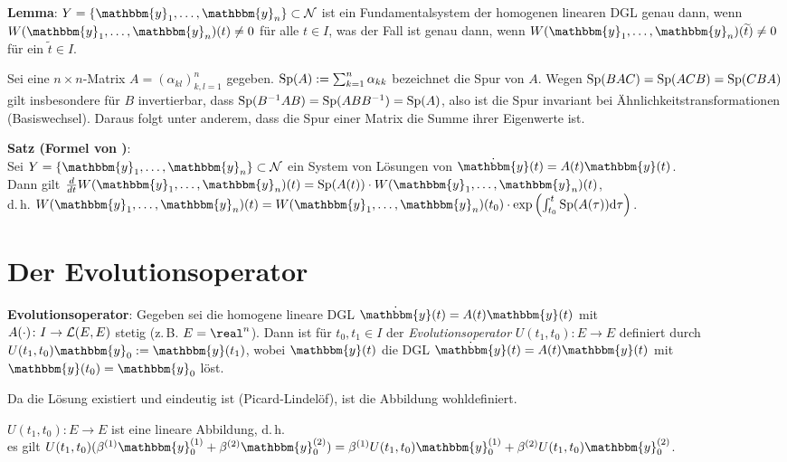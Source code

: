 \linie

\textbf{Lemma}:
$Y = \{\mathbbm{y}_1, \dotsc, \mathbbm{y}_n\} \subset \mathcal{N}$
ist ein Fundamentalsystem der homogenen linearen DGL  genau
dann, wenn $W(\mathbbm{y}_1, \dotsc, \mathbbm{y}_n)(t) \not= 0$ für alle
$t \in I$, was der Fall ist genau dann, wenn
$W(\mathbbm{y}_1, \dotsc, \mathbbm{y}_n)(\widetilde{t}) \not= 0$ für ein
$\widetilde{t} \in I$.

Sei eine $n \times n$-Matrix $A = (\alpha_{kl})_{k,l=1}^n$ gegeben.
$\operatorname{Sp}(A) := \sum_{k=1}^n \alpha_{kk}$ bezeichnet die Spur von $A$.
Wegen $\operatorname{Sp}(BAC) = \operatorname{Sp}(ACB) = \operatorname{Sp}(CBA)$ gilt insbesondere für $B$ invertierbar,
dass $\operatorname{Sp}(B^{-1} A B) = \operatorname{Sp}(A B B^{-1}) = \operatorname{Sp}(A)$, also ist die Spur invariant
bei Ähnlichkeitstransformationen (Basiswechsel).
Daraus folgt unter anderem, dass die Spur einer Matrix die Summe ihrer
Eigenwerte ist.

\textbf{Satz (Formel von )}: \\
Sei $Y = \{\mathbbm{y}_1, \dotsc, \mathbbm{y}_n\} \subset \mathcal{N}$
ein System von Lösungen von $\dot{\mathbbm{y}}(t) = A(t) \mathbbm{y}(t)$. \\
Dann gilt $\frac{d}{dt} W(\mathbbm{y}_1, \dotsc, \mathbbm{y}_n)(t) =
\Sp(A(t)) \cdot W(\mathbbm{y}_1, \dotsc, \mathbbm{y}_n)(t)$, \\
d.\,h. $W(\mathbbm{y}_1, \dotsc, \mathbbm{y}_n)(t) =
W(\mathbbm{y}_1, \dotsc, \mathbbm{y}_n)(t_0) \cdot
\exp\left(\int_{t_0}^t \Sp(A(\tau))\d\tau\right)$.

\pagebreak

\section{%
    Der Evolutionsoperator%
}

\textbf{Evolutionsoperator}:
Gegeben sei die homogene lineare DGL
$\dot{\mathbbm{y}}(t) = A(t) \mathbbm{y}(t)$ mit \\
$A(\cdot)\colon I \rightarrow \mathcal{L}(E, E)$ stetig (z.\,B. $E = \real^n$).
Dann ist für $t_0, t_1 \in I$ der \emph{Evolutionsoperator}
$U(t_1, t_0)\colon E \rightarrow E$ definiert durch
$U(t_1, t_0) \mathbbm{y}_0 := \mathbbm{y}(t_1)$, wobei $\mathbbm{y}(t)$ die DGL
$\dot{\mathbbm{y}}(t) = A(t) \mathbbm{y}(t)$ mit
$\mathbbm{y}(t_0) = \mathbbm{y}_0$ löst.

Da die Lösung existiert und eindeutig ist (Picard-Lindelöf),
ist die Abbildung wohldefiniert.

$U(t_1, t_0)\colon E \rightarrow E$ ist eine lineare Abbildung, d.\,h. \\
es gilt $U(t_1, t_0)(\beta^{(1)} \mathbbm{y}_0^{(1)} +
\beta^{(2)} \mathbbm{y}_0^{(2)}) =
\beta^{(1)} U(t_1, t_0) \mathbbm{y}_0^{(1)} +
\beta^{(2)} U(t_1, t_0) \mathbbm{y}_0^{(2)}$.

